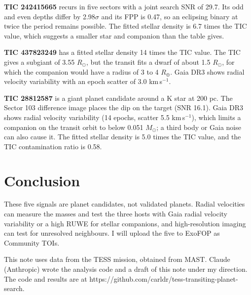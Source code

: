 \documentclass{aastex701}
\begin{document}
\textbf{TIC 242415665} recurs in five sectors with a joint search SNR of 29.7. Its odd and even depths differ by
2.98$\sigma$ and its FPP is 0.47, so an eclipsing binary at twice the period remains possible. The fitted stellar
density is 6.7 times the TIC value, which suggests a smaller star and companion than the table gives.

\textbf{TIC 437823249} has a fitted stellar density 14 times the TIC value. The TIC gives a subgiant of
3.55 $R_\odot$, but the transit fits a dwarf of about 1.5 $R_\odot$, for which the companion would have a radius of
3 to 4 $R_\oplus$. Gaia DR3 shows radial velocity variability with an epoch scatter of 3.0 km\,s$^{-1}$.

\textbf{TIC 28812587} is a giant planet candidate around a K star at 200 pc. The Sector 103 difference image places
the dip on the target (SNR 16.1). Gaia DR3 shows radial velocity variability (14 epochs, scatter
5.5 km\,s$^{-1}$), which limits a companion on the transit orbit to below 0.051 $M_\odot$; a third body or Gaia
noise can also cause it. The fitted stellar density is 5.0 times the TIC value, and the TIC contamination ratio is
0.58.

\section{Conclusion}

These five signals are planet candidates, not validated planets. Radial velocities can measure the masses and test
the three hosts with Gaia radial velocity variability or a high RUWE for stellar companions, and high-resolution
imaging can test for unresolved neighbours. I will upload the five to ExoFOP as Community TOIs.

\begin{acknowledgments}
This note uses data from the TESS mission, obtained from MAST. Claude (Anthropic) wrote the analysis code and a draft of
this note under my direction. The code and results are at https://github.com/carldr/tess-transiting-planet-search.
\end{acknowledgments}



{}

\end{document}
